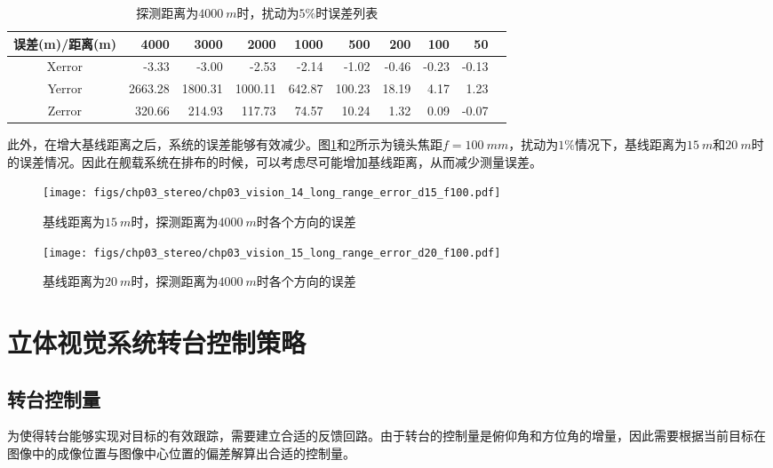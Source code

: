 \begin{table}[htb]
	\centering
	\caption{探测距离为$4000\ m$时，扰动为$5\%$时误差列表}
	\label{label:chp03_stereo_2}
	\begin{tabular}{crrrrrrrrr}
		\hline
		误差(m)/距离(m)     & 4000    & 3000    & 2000      & 1000  & 500    & 200   & 100   & 50    \\ \hline
		Xerror  & -3.33   & -3.00   & -2.53   & -2.14   & -1.02  & -0.46 & -0.23 & -0.13 \\ 
		Yerror & 2663.28 & 1800.31 & 1000.11 & 642.87  & 100.23 & 18.19 & 4.17  & 1.23  \\
		Zerror & 320.66  & 214.93  & 117.73  & 74.57   & 10.24  & 1.32  & 0.09  & -0.07 \\ \hline
		
	\end{tabular}
\end{table}

此外，在增大基线距离之后，系统的误差能够有效减少。图\ref{fig:chp03_vision_14_long_range_error_d15_f100}和\ref{fig:chp03_vision_15_long_range_error_d20_f100}所示为镜头焦距$f=100\ mm$，扰动为$1\%$情况下，基线距离为$15\ m$和$20\ m$时的误差情况。因此在舰载系统在排布的时候，可以考虑尽可能增加基线距离，从而减少测量误差。

\begin{figure}[htb]
	\centering
	\texttt{[image: figs/chp03\_stereo/chp03\_vision\_14\_long\_range\_error\_d15\_f100.pdf]}	
	\caption{基线距离为$15\ m$时，探测距离为$4000\ m$时各个方向的误差}
	\label{fig:chp03_vision_14_long_range_error_d15_f100}
\end{figure}

\begin{figure}[htb]
	\centering
	\texttt{[image: figs/chp03\_stereo/chp03\_vision\_15\_long\_range\_error\_d20\_f100.pdf]}	
	\caption{基线距离为$20\ m$时，探测距离为$4000\ m$时各个方向的误差}
	\label{fig:chp03_vision_15_long_range_error_d20_f100}
\end{figure}

\section{立体视觉系统转台控制策略}
\subsection{转台控制量}
为使得转台能够实现对目标的有效跟踪，需要建立合适的反馈回路。由于转台的控制量是俯仰角和方位角的增量，因此需要根据当前目标在图像中的成像位置与图像中心位置的偏差解算出合适的控制量。


